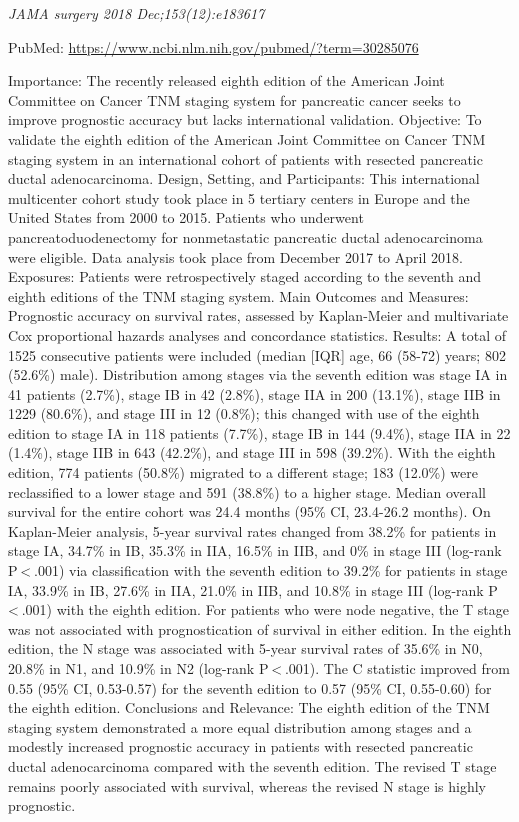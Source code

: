 \documentclass[]{article}
\begin{document}
\emph{JAMA surgery 2018 Dec;153(12):e183617}

PubMed: \url{https://www.ncbi.nlm.nih.gov/pubmed/?term=30285076}

Importance: The recently released eighth edition of the American Joint
Committee on Cancer TNM staging system for pancreatic cancer seeks to
improve prognostic accuracy but lacks international validation.
Objective: To validate the eighth edition of the American Joint
Committee on Cancer TNM staging system in an international cohort of
patients with resected pancreatic ductal adenocarcinoma. Design,
Setting, and Participants: This international multicenter cohort study
took place in 5 tertiary centers in Europe and the United States from
2000 to 2015. Patients who underwent pancreatoduodenectomy for
nonmetastatic pancreatic ductal adenocarcinoma were eligible. Data
analysis took place from December 2017 to April 2018. Exposures:
Patients were retrospectively staged according to the seventh and eighth
editions of the TNM staging system. Main Outcomes and Measures:
Prognostic accuracy on survival rates, assessed by Kaplan-Meier and
multivariate Cox proportional hazards analyses and concordance
statistics. Results: A total of 1525 consecutive patients were included
(median {[}IQR{]} age, 66 (58-72) years; 802 (52.6\%) male).
Distribution among stages via the seventh edition was stage IA in 41
patients (2.7\%), stage IB in 42 (2.8\%), stage IIA in 200 (13.1\%),
stage IIB in 1229 (80.6\%), and stage III in 12 (0.8\%); this changed
with use of the eighth edition to stage IA in 118 patients (7.7\%),
stage IB in 144 (9.4\%), stage IIA in 22 (1.4\%), stage IIB in 643
(42.2\%), and stage III in 598 (39.2\%). With the eighth edition, 774
patients (50.8\%) migrated to a different stage; 183 (12.0\%) were
reclassified to a lower stage and 591 (38.8\%) to a higher stage. Median
overall survival for the entire cohort was 24.4 months (95\% CI,
23.4-26.2 months). On Kaplan-Meier analysis, 5-year survival rates
changed from 38.2\% for patients in stage IA, 34.7\% in IB, 35.3\% in
IIA, 16.5\% in IIB, and 0\% in stage III (log-rank P \textless{} .001)
via classification with the seventh edition to 39.2\% for patients in
stage IA, 33.9\% in IB, 27.6\% in IIA, 21.0\% in IIB, and 10.8\% in
stage III (log-rank P \textless{} .001) with the eighth edition. For
patients who were node negative, the T stage was not associated with
prognostication of survival in either edition. In the eighth edition,
the N stage was associated with 5-year survival rates of 35.6\% in N0,
20.8\% in N1, and 10.9\% in N2 (log-rank P \textless{} .001). The C
statistic improved from 0.55 (95\% CI, 0.53-0.57) for the seventh
edition to 0.57 (95\% CI, 0.55-0.60) for the eighth edition. Conclusions
and Relevance: The eighth edition of the TNM staging system demonstrated
a more equal distribution among stages and a modestly increased
prognostic accuracy in patients with resected pancreatic ductal
adenocarcinoma compared with the seventh edition. The revised T stage
remains poorly associated with survival, whereas the revised N stage is
highly prognostic.
\end{document}
